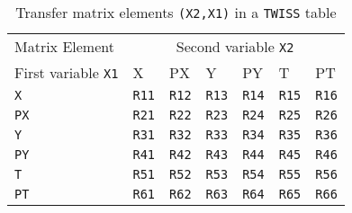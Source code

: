 \begin{table}[Ht]
  \caption{Transfer matrix elements \texttt{(X2,X1)} in a \texttt{TWISS} table}
  \label{tab:twiss-mat}
  \begin{center}
    \begin{tabular}{|l|l|l|l|l|l|l|}
      \hline
      Matrix Element & \multicolumn{6}{c|}{Second variable \texttt{X2}} \\
      First variable \texttt{X1} & X & PX & Y & PY & T & PT \\
      \hline
      \texttt{X} &
      \texttt{R11}\index{R11} & \texttt{R12}\index{R12} &
      \texttt{R13}\index{R13} & \texttt{R14}\index{R14} &
      \texttt{R15}\index{R15} & \texttt{R16}\index{R16} \\
      \texttt{PX} &
      \texttt{R21}\index{R21} & \texttt{R22}\index{R22} &
      \texttt{R23}\index{R23} & \texttt{R24}\index{R24} &
      \texttt{R25}\index{R25} & \texttt{R26}\index{R26} \\
      \texttt{Y} &
      \texttt{R31}\index{R31} & \texttt{R32}\index{R32} &
      \texttt{R33}\index{R33} & \texttt{R34}\index{R34} &
      \texttt{R35}\index{R35} & \texttt{R36}\index{R36} \\
      \texttt{PY} &
      \texttt{R41}\index{R41} & \texttt{R42}\index{R42} &
      \texttt{R43}\index{R43} & \texttt{R44}\index{R44} &
      \texttt{R45}\index{R45} & \texttt{R46}\index{R46} \\
      \texttt{T} &
      \texttt{R51}\index{R51} & \texttt{R52}\index{R52} &
      \texttt{R53}\index{R53} & \texttt{R54}\index{R54} &
      \texttt{R55}\index{R55} & \texttt{R56}\index{R56} \\
      \texttt{PT} &
      \texttt{R61}\index{R61} & \texttt{R62}\index{R62} &
      \texttt{R63}\index{R63} & \texttt{R64}\index{R64} &
      \texttt{R65}\index{R65} & \texttt{R66}\index{R66} \\
      \hline
    \end{tabular}
  \end{center}
\end{table}

